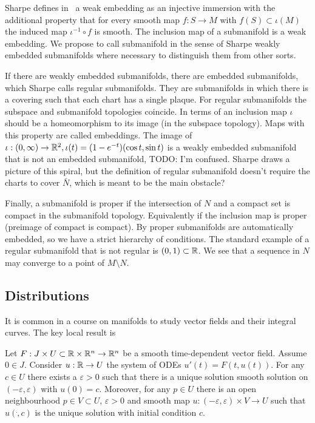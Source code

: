 Sharpe defines in~\cite[Definition~1.1.4]{Sharpe1997} a weak embedding as an injective immersion with the additional property that for every smooth map $f : S \to M$ with $f(S) \subset \iota(M)$ the induced map $\iota^{-1} \circ f$ is smooth.
The inclusion map of a submanifold is a weak embedding.
We propose to call submanifold in the sense of Sharpe weakly embedded submanifolds where necessary to distinguish them from other sorts.

If there are weakly embedded submanifolds, there are embedded submanifolds, which Sharpe calls regular submanifolds.
They are submanifolds in which there is a covering such that each chart has a single plaque.
For regular submanifolds the subspace and submanifold topologies coincide.
In terms of an inclusion map $\iota$ should be a homeomorphism to its image (in the subspace topology).
Maps with this property are called embeddings.
The image of $\iota : (0,\infty) \to \mathbb{R}^2, \iota(t) = (1-e^{-t})(\cos t, \sin t)$ is a weakly embedded submanifold that is not an embedded submanifold, 
TODO: I'm confused. Sharpe draws a picture of this spiral, but the definition of regular submanifold doesn't require the charts to cover $\bar{N}$, which is meant to be the main obstacle?

Finally, a submanifold is proper if the intersection of $N$ and a compact set is compact in the submanifold topology.
Equivalently if the inclusion map is proper (preimage of compact is compact).
By \cite[Theorem~1.2.11]{Sharpe1997} proper submanifolds are automatically embedded, so we have a strict hierarchy of conditions.
The standard example of a regular submanifold that is not regular is $(0,1) \subset \mathbb{R}$.
We see that a sequence in $N$ may converge to a point of $M\setminus N$.


\subsection{Distributions}

It is common in a course on manifolds to study vector fields and their integral curves.
The key local result is
\begin{theorem}
Let $F : J \times U \subset \mathbb{R}\times\mathbb{R}^n \to \mathbb{R}^n$ be a smooth time-dependent vector field. 
Assume $0 \in J$. 
Consider $u : \mathbb{R} \to U$ the system of ODEs $u'(t) = F(t,u(t))$.
For any $c \in U$ there exists a $\varepsilon > 0$ such that there is a unique solution smooth solution on $(-\varepsilon,\varepsilon)$ with $u(0) = c$.
Moreover, for any $p \in U$ there is an open neighbourhood $p \in V \subset U$, $\varepsilon > 0$ and smooth map $u : (-\varepsilon,\varepsilon) \times V \to U$ such that $u(\dot,c)$ is the unique solution with initial condition $c$.
\\\textup{\cite[Theorem~2.1.1]{Sharpe1997}}\cite[Theorem~1.2.1]{Ivey}
\end{theorem}

